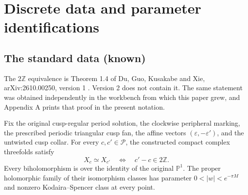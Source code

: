 \section{Discrete data and parameter identifications}\label{sec:discrete}
\subsection{The standard data (known)}
The $2\mathbb Z$ equivalence is Theorem 1.4 of Du, Guo, Kusakabe and Xie, arXiv:2610.00250, version 1 \cite[Theorem 1.4]{DGKXv1}. Version 2 does not contain it. The same statement was obtained independently in the workbench from which this paper grew, and Appendix A prints that proof in the present notation.
\begin{cited}[FAM A.5.1; K]\label{fam:A.5.1}
Fix the original cusp-regular period solution, the clockwise peripheral marking, the prescribed periodic triangular cusp fan, the affine vectors $(\varepsilon,-\varepsilon')$, and the untwisted cusp collar. For every $c,c'\in\mathcal P$, the constructed compact complex threefolds satisfy
\[
 X_c\simeq X_{c'}\quad\Longleftrightarrow\quad c'-c\in2\mathbb Z.
\]
Every biholomorphism is over the identity of the original $\mathbb P^1$. The proper holomorphic family of their isomorphism classes has parameter $0<|w|<e^{-\pi M}$ and nonzero Kodaira--Spencer class at every point.
\end{cited}

